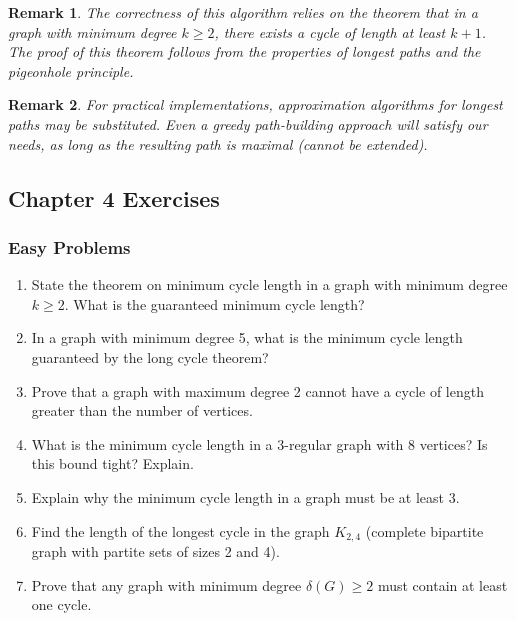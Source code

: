 \documentclass{article}
\newtheorem{remark}{Remark}
\theoremstyle{definition}
\begin{document}
\begin{remark}
The correctness of this algorithm relies on the theorem that in a graph with minimum degree $k \geq 2$, there exists a cycle of length at least $k+1$. The proof of this theorem follows from the properties of longest paths and the pigeonhole principle.
\end{remark}

\begin{remark}
For practical implementations, approximation algorithms for longest paths may be substituted. Even a greedy path-building approach will satisfy our needs, as long as the resulting path is maximal (cannot be extended).
\end{remark}

\subsection{Chapter 4 Exercises}

\subsubsection{Easy Problems}
\begin{enumerate}
\item State the theorem on minimum cycle length in a graph with minimum degree $k \geq 2$. What is the guaranteed minimum cycle length?

\item In a graph with minimum degree 5, what is the minimum cycle length guaranteed by the long cycle theorem?

\item Prove that a graph with maximum degree 2 cannot have a cycle of length greater than the number of vertices.

\item What is the minimum cycle length in a 3-regular graph with 8 vertices? Is this bound tight? Explain.

\item Explain why the minimum cycle length in a graph must be at least 3.

\item Find the length of the longest cycle in the graph $K_{2,4}$ (complete bipartite graph with partite sets of sizes 2 and 4).

\item Prove that any graph with minimum degree $\delta(G) \geq 2$ must contain at least one cycle.
\end{enumerate}
\end{document}

